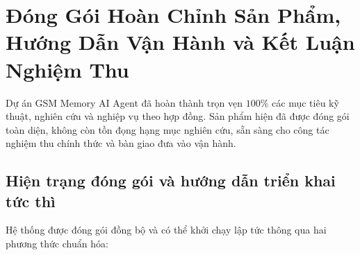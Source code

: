 \documentclass[a4paper,11pt]{article}
\begin{document}
\section{Đóng Gói Hoàn Chỉnh Sản Phẩm, Hướng Dẫn Vận Hành và Kết Luận Nghiệm Thu}
\label{sec:handover}

Dự án GSM Memory AI Agent đã hoàn thành trọn vẹn $100\%$ các mục tiêu kỹ thuật, nghiên cứu và nghiệp vụ theo hợp đồng. Sản phẩm hiện đã được đóng gói toàn diện, không còn tồn đọng hạng mục nghiên cứu, sẵn sàng cho công tác nghiệm thu chính thức và bàn giao đưa vào vận hành.

\subsection{Hiện trạng đóng gói và hướng dẫn triển khai tức thì}
Hệ thống được đóng gói đồng bộ và có thể khởi chạy lập tức thông qua hai phương thức chuẩn hóa:
\end{document}
